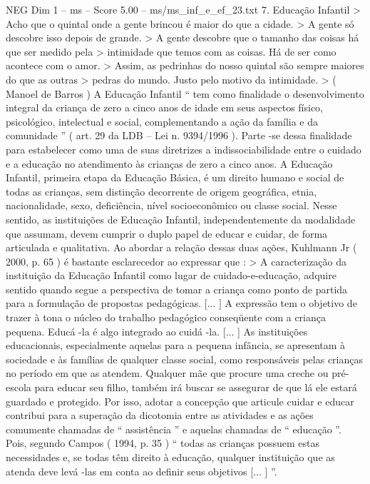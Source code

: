 \begin{textsample}{NEG Dim 1 – ms – Score 5.00 – ms/ms\_inf\_e\_ef\_23.txt}  \label{ex:f1_neg_109}
7.
Educação Infantil > Acho que o quintal onde a gente brincou é maior do que a cidade. > A gente só descobre isso depois de grande. > A gente descobre que o tamanho das coisas há que ser medido pela > intimidade que temos com as coisas.
Há de ser como acontece com o amor. > Assim, as pedrinhas do nosso quintal são sempre maiores do que as outras > pedras do mundo.
Justo pelo motivo da intimidade. > ( Manoel de Barros ) A Educação Infantil “ tem como finalidade o desenvolvimento integral da criança de zero a cinco anos de idade em seus aspectos físico, psicológico, intelectual e social, complementando a ação da família e da comunidade ” ( art. 29 da LDB – Lei n. 9394/1996 ).
Parte -se dessa finalidade para estabelecer como uma de suas diretrizes a indissociabilidade entre o cuidado e a educação no atendimento às crianças de zero a cinco anos.
A Educação Infantil, primeira etapa da Educação Básica, é um direito humano e social de todas as crianças, sem distinção decorrente de origem geográfica, etnia, nacionalidade, sexo, deficiência, nível socioeconômico ou classe social.
Nesse sentido, as instituições de Educação Infantil, independentemente da modalidade que assumam, devem cumprir o duplo papel de educar e cuidar, de forma articulada e qualitativa.
Ao abordar a relação dessas duas ações, Kuhlmann Jr ( 2000, p. 65 ) é bastante esclarecedor ao expressar que : > A caracterização da instituição da Educação Infantil como lugar de cuidado-e-educação, adquire sentido quando segue a perspectiva de tomar a criança como ponto de partida para a formulação de propostas pedagógicas. [... ] A expressão tem o objetivo de trazer à tona o núcleo do trabalho pedagógico conseqüente com a criança pequena.
Educá -la é algo integrado ao cuidá -la. [... ] As instituições educacionais, especialmente aquelas para a pequena infância, se apresentam à sociedade e às famílias de qualquer classe social, como responsáveis pelas crianças no período em que as atendem.
Qualquer mãe que procure uma creche ou pré-escola para educar seu filho, também irá buscar se assegurar de que lá ele estará guardado e protegido.
Por isso, adotar a concepção que articule cuidar e educar contribui para a superação da dicotomia entre as atividades e as ações comumente chamadas de “ assistência ” e aquelas chamadas de “ educação ”.
Pois, segundo Campos ( 1994, p. 35 ) “ todas as crianças possuem estas necessidades e, se todas têm direito à educação, qualquer instituição que as atenda deve levá -las em conta ao definir seus objetivos [... ] ”.

\end{textsample}
